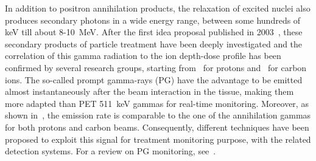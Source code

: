 In addition to positron annihilation products, the relaxation of excited nuclei also produces secondary photons in a wide energy range, between some hundreds of keV till about 8-10~MeV. After the first idea proposal published in 2003~\cite{PG_first}, these secondary products of particle treatment have been deeply investigated and the correlation of this gamma radiation to the ion depth-dose profile has been confirmed by several research groups, starting from~\cite{Min_PG} for protons and~\cite{Testa_PG} for carbon ions. The so-called prompt gamma-rays (PG) have the advantage to be emitted almost instantaneously after the beam interaction in the tissue, making them more adapted than PET 511~keV gammas for real-time monitoring. Moreover, as shown in~\cite{Robert2013}, the emission rate is comparable to the one of the annihilation gammas for both protons and carbon beams. Consequently, different techniques have been proposed to exploit this signal for treatment monitoring purpose, with the related detection systems. For a review on PG monitoring, see~\cite{krimmer:hal-01585334}.

